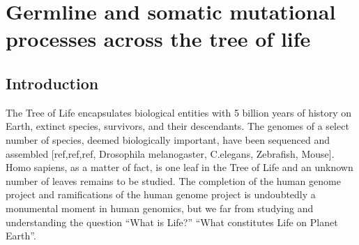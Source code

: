\chapter{Germline and somatic mutational processes across the tree of life}

\ifpdf
    \graphicspath{{Chapter3/Figs/Raster/}{Chapter3/Figs/PDF/}{Chapter3/Figs/}}
\else
    \graphicspath{{Chapter3/Figs/Vector/}{Chapter3/Figs/}}
\fi


\section{Introduction}

The Tree of Life encapsulates biological entities with 5 billion years of history on Earth, extinct species, survivors, and their descendants. The genomes of a select number of species, deemed biologically important, have been sequenced and assembled [ref,ref,ref, Drosophila melanogaster, C.elegans, Zebrafish, Mouse].  Homo sapiens, as a matter of fact, is one leaf in the Tree of Life and an unknown number of leaves remains to be studied. The completion of the human genome project and ramifications of the human genome project is undoubtedly a monumental moment in human genomics, but we far from studying and understanding the question “What is Life?” “What constitutes Life on Planet Earth”.


